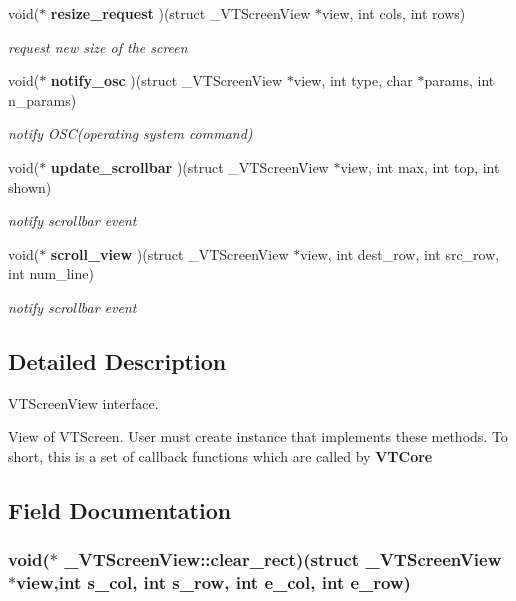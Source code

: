 \begin{CompactItemize}
void($\ast$ {\bf resize\_\-request} )(struct \_\-VTScreen\-View $\ast$view, int cols, int rows)
\begin{CompactList}\small\item\em request new size of the screen\item\end{CompactList}\item 
void($\ast$ {\bf notify\_\-osc} )(struct \_\-VTScreen\-View $\ast$view, int type, char $\ast$params, int n\_\-params)
\begin{CompactList}\small\item\em notify OSC(operating system command)\item\end{CompactList}\item 
void($\ast$ {\bf update\_\-scrollbar} )(struct \_\-VTScreen\-View $\ast$view, int max, int top, int shown)
\begin{CompactList}\small\item\em notify scrollbar event\item\end{CompactList}\item 
void($\ast$ {\bf scroll\_\-view} )(struct \_\-VTScreen\-View $\ast$view, int dest\_\-row, int src\_\-row, int num\_\-line)
\begin{CompactList}\small\item\em notify scrollbar event\item\end{CompactList}\end{CompactItemize}


\subsection{Detailed Description}
VTScreen\-View interface.

\par
 View of VTScreen. User must create instance that implements these methods. To short, this is a set of callback functions which are called by {\bf VTCore } 



\subsection{Field Documentation}
\subsubsection{\setlength{\rightskip}{0pt plus 5cm}void($\ast$ \_\-VTScreen\-View::clear\_\-rect)(struct \_\-VTScreen\-View $\ast$view,int s\_\-col, int s\_\-row, int e\_\-col, int e\_\-row)}\label{struct__VTScreenView_m4}


